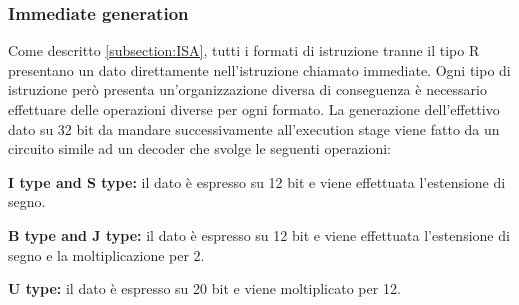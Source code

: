 \subsubsection{Immediate generation}
Come descritto \autoref{subsection:ISA}, tutti i formati di istruzione tranne il tipo R presentano un dato direttamente nell'istruzione chiamato immediate. Ogni tipo di istruzione però presenta un'organizzazione diversa di conseguenza è necessario effettuare delle operazioni diverse per ogni formato. La generazione dell'effettivo dato su 32 bit da mandare successivamente all'execution stage viene fatto da un circuito simile ad un decoder che svolge le seguenti operazioni:
\begin{description}
    \item \textbf{I type and S type:} il dato è espresso su 12 bit e viene effettuata l'estensione di segno.
    \item \textbf{B type and J type:} il dato è espresso su 12 bit e viene effettuata l'estensione di segno e la moltiplicazione per 2.
    \item \textbf{U type:} il dato è espresso su 20 bit e viene moltiplicato per 12.
\end{description}
